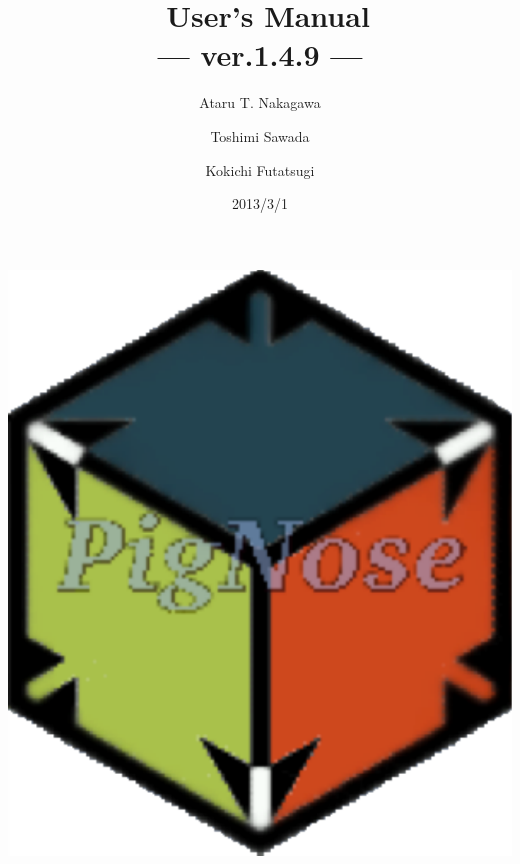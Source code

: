 \documentclass[a4paper]{memoir}
\begin{document}
\tightlists
\midsloppy
{}
\frontmatter
\pagestyle{empty}
\title{\cafeobj~User's Manual \\ --- ver.1.4.9 ---}
\author{Ataru T. Nakagawa \and Toshimi Sawada \and Kokichi Futatsugi}
\date{2013/3/1}


\maketitle
\vfill
\begin{center}
\includegraphics[scale=0.2]{cafe-logo.pdf}
\end{center}
\vfill
\thispagestyle{empty}

\end{document}
